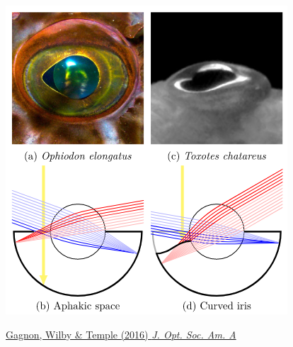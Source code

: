 \documentclass{beamer} %
\begin{document}
\begin{frame}
\begin{columns}
      \begin{column}{0.5\textwidth}
        \begin{center}
          \includegraphics[width=\textwidth]{fisheyes.png}
        \end{center}
        \tiny
        \href{https://doi.org/10.1364/JOSAA.33.001901}{Gagnon, Wilby \& Temple (2016) \textit{J. Opt. Soc. Am. A}}
      \end{column}
    \end{columns}
  \end{frame}
\end{document}
